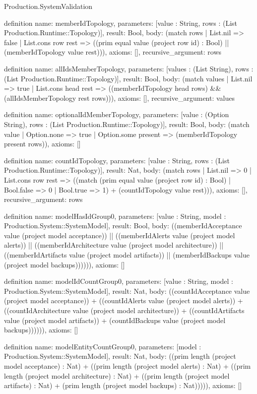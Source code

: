 \begin{lexlean}{Production.SystemValidation}
\begin{semanticmodule}
definition{
  name: memberIdTopology,
  parameters: [value : String, rows : (List Production.Runtime::Topology)],
  result: Bool,
  body: (match rows
    | List.nil => false
    | List.cons row rest => ((prim equal value (project row id) : Bool) || (memberIdTopology value rest))),
  axioms: [],
  recursive_argument: rows
}

definition{
  name: allIdsMemberTopology,
  parameters: [values : (List String), rows : (List Production.Runtime::Topology)],
  result: Bool,
  body: (match values
    | List.nil => true
    | List.cons head rest => ((memberIdTopology head rows) && (allIdsMemberTopology rest rows))),
  axioms: [],
  recursive_argument: values
}

definition{
  name: optionalIdMemberTopology,
  parameters: [value : (Option String), rows : (List Production.Runtime::Topology)],
  result: Bool,
  body: (match value
    | Option.none => true
    | Option.some present => (memberIdTopology present rows)),
  axioms: []
}

definition{
  name: countIdTopology,
  parameters: [value : String, rows : (List Production.Runtime::Topology)],
  result: Nat,
  body: (match rows
    | List.nil => 0
    | List.cons row rest => ((match (prim equal value (project row id) : Bool)
      | Bool.false => 0
      | Bool.true => 1) + (countIdTopology value rest))),
  axioms: [],
  recursive_argument: rows
}

definition{
  name: modelHasIdGroup0,
  parameters: [value : String, model : Production.System::SystemModel],
  result: Bool,
  body: ((memberIdAcceptance value (project model acceptance)) || ((memberIdAlerts value (project model alerts)) || ((memberIdArchitecture value (project model architecture)) || ((memberIdArtifacts value (project model artifacts)) || (memberIdBackups value (project model backups)))))),
  axioms: []
}

definition{
  name: modelIdCountGroup0,
  parameters: [value : String, model : Production.System::SystemModel],
  result: Nat,
  body: ((countIdAcceptance value (project model acceptance)) + ((countIdAlerts value (project model alerts)) + ((countIdArchitecture value (project model architecture)) + ((countIdArtifacts value (project model artifacts)) + (countIdBackups value (project model backups)))))),
  axioms: []
}

definition{
  name: modelEntityCountGroup0,
  parameters: [model : Production.System::SystemModel],
  result: Nat,
  body: ((prim length (project model acceptance) : Nat) + ((prim length (project model alerts) : Nat) + ((prim length (project model architecture) : Nat) + ((prim length (project model artifacts) : Nat) + (prim length (project model backups) : Nat))))),
  axioms: []
}


\end{semanticmodule}
\end{lexlean}
